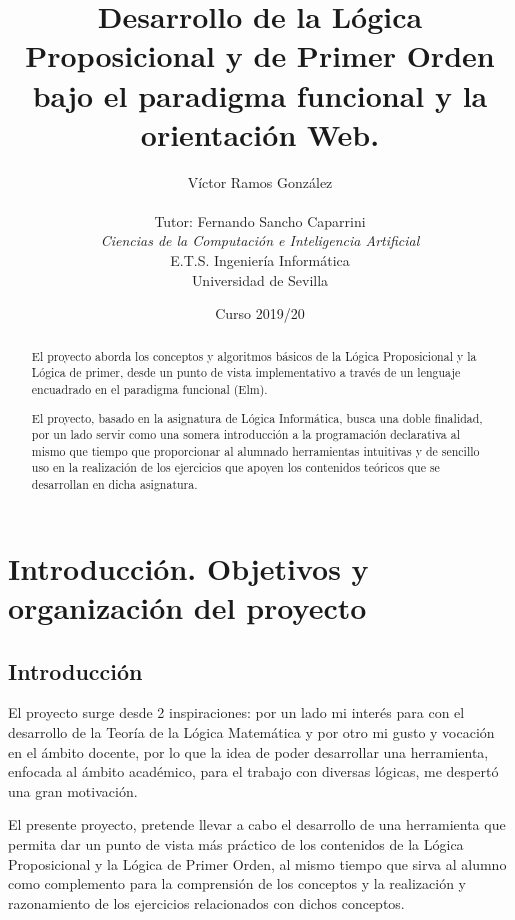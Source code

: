 \documentclass[a4paper]{report}
\title{Desarrollo de la Lógica Proposicional y de Primer Orden bajo el paradigma funcional y la orientación Web.}
\author{Víctor Ramos González\\\\
   Tutor: Fernando Sancho Caparrini\\
   \textit{Ciencias de la Computación e Inteligencia Artificial}\\
   E.T.S. Ingeniería Informática\\
   Universidad de Sevilla\\
  \vspace{8cm}
  \date{Curso 2019/20}
}
\def\blankpage{%
      \clearpage%
      \thispagestyle{empty}%
      \addtocounter{page}{0}%
      \null%
      \clearpage}
\begin{document}
\renewcommand{\tablename}{Tabla}
\renewcommand{\appendixname}{Anexo}
\renewcommand{\appendixtocname}{Anexos}
\renewcommand{\appendixpagename}{Anexos}

\newcommand{\toDo}{\fbox{TO DO}}
\dominitoc




\blankpage

\maketitle


\begin{abstract}

El proyecto aborda los conceptos y algoritmos básicos de la Lógica Proposicional y la Lógica de primer, desde un punto de vista implementativo a través de un lenguaje encuadrado en el paradigma funcional (Elm).

El proyecto, basado en la asignatura de Lógica Informática, busca una doble finalidad, por un lado servir como una somera introducción a la programación declarativa al mismo que tiempo que proporcionar al alumnado  herramientas intuitivas y de sencillo uso en la realización de los ejercicios que apoyen los contenidos teóricos que se desarrollan en dicha asignatura.
\end{abstract}

\tableofcontents

\newpage


\chapter{Introducción. Objetivos y organización del proyecto}
\renewcommand{\mtctitle}{}
\mtcskip
\minitoc
\newpage

\section{Introducción}

El proyecto surge desde 2 inspiraciones: por un lado mi interés para con el desarrollo de la Teoría de la Lógica Matemática y por otro mi gusto y vocación en el ámbito docente, por lo que la idea de poder desarrollar una herramienta, enfocada al ámbito académico, para el trabajo con diversas lógicas, me despertó una gran motivación.

El presente proyecto, pretende llevar a cabo el  desarrollo de una herramienta que permita dar un punto de vista más práctico de los contenidos de la Lógica Proposicional y la Lógica de Primer Orden, al mismo tiempo que sirva al alumno como complemento para la comprensión de los conceptos y la realización y razonamiento de los ejercicios relacionados con dichos conceptos.
\end{document}
